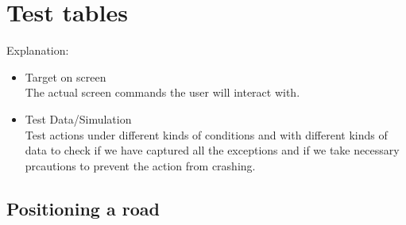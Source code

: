 \newcommand{\pass}{[\sethlcolor{green}\hl{PASS}] / [\sethlcolor{red}\hl{FAIL}]}
\section{Test tables}
Explanation: 
\begin{itemize}
	\item Target on screen\\
	The actual screen commands the user will interact with.
	\item Test Data/Simulation\\
	Test actions under different kinds of conditions and with different kinds of data to check if we have captured all the exceptions and if we take necessary prcautions to prevent the action from crashing.
\end{itemize}

\newpage

\subsection{Positioning a road}

